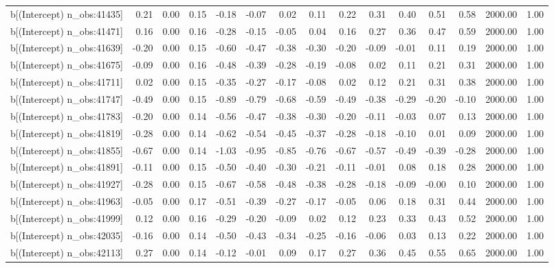 \begin{table}[ht]
\begin{tabular}{rrrrrrrrrrrrrrr}
  b[(Intercept) n\_obs:41435] & 0.21 & 0.00 & 0.15 & -0.18 & -0.07 & 0.02 & 0.11 & 0.22 & 0.31 & 0.40 & 0.51 & 0.58 & 2000.00 & 1.00 \\ 
  b[(Intercept) n\_obs:41471] & 0.16 & 0.00 & 0.16 & -0.28 & -0.15 & -0.05 & 0.04 & 0.16 & 0.27 & 0.36 & 0.47 & 0.59 & 2000.00 & 1.00 \\ 
  b[(Intercept) n\_obs:41639] & -0.20 & 0.00 & 0.15 & -0.60 & -0.47 & -0.38 & -0.30 & -0.20 & -0.09 & -0.01 & 0.11 & 0.19 & 2000.00 & 1.00 \\ 
  b[(Intercept) n\_obs:41675] & -0.09 & 0.00 & 0.16 & -0.48 & -0.39 & -0.28 & -0.19 & -0.08 & 0.02 & 0.11 & 0.21 & 0.31 & 2000.00 & 1.00 \\ 
  b[(Intercept) n\_obs:41711] & 0.02 & 0.00 & 0.15 & -0.35 & -0.27 & -0.17 & -0.08 & 0.02 & 0.12 & 0.21 & 0.31 & 0.38 & 2000.00 & 1.00 \\ 
  b[(Intercept) n\_obs:41747] & -0.49 & 0.00 & 0.15 & -0.89 & -0.79 & -0.68 & -0.59 & -0.49 & -0.38 & -0.29 & -0.20 & -0.10 & 2000.00 & 1.00 \\ 
  b[(Intercept) n\_obs:41783] & -0.20 & 0.00 & 0.14 & -0.56 & -0.47 & -0.38 & -0.30 & -0.20 & -0.11 & -0.03 & 0.07 & 0.13 & 2000.00 & 1.00 \\ 
  b[(Intercept) n\_obs:41819] & -0.28 & 0.00 & 0.14 & -0.62 & -0.54 & -0.45 & -0.37 & -0.28 & -0.18 & -0.10 & 0.01 & 0.09 & 2000.00 & 1.00 \\ 
  b[(Intercept) n\_obs:41855] & -0.67 & 0.00 & 0.14 & -1.03 & -0.95 & -0.85 & -0.76 & -0.67 & -0.57 & -0.49 & -0.39 & -0.28 & 2000.00 & 1.00 \\ 
  b[(Intercept) n\_obs:41891] & -0.11 & 0.00 & 0.15 & -0.50 & -0.40 & -0.30 & -0.21 & -0.11 & -0.01 & 0.08 & 0.18 & 0.28 & 2000.00 & 1.00 \\ 
  b[(Intercept) n\_obs:41927] & -0.28 & 0.00 & 0.15 & -0.67 & -0.58 & -0.48 & -0.38 & -0.28 & -0.18 & -0.09 & -0.00 & 0.10 & 2000.00 & 1.00 \\ 
  b[(Intercept) n\_obs:41963] & -0.05 & 0.00 & 0.17 & -0.51 & -0.39 & -0.27 & -0.17 & -0.05 & 0.06 & 0.18 & 0.31 & 0.44 & 2000.00 & 1.00 \\ 
  b[(Intercept) n\_obs:41999] & 0.12 & 0.00 & 0.16 & -0.29 & -0.20 & -0.09 & 0.02 & 0.12 & 0.23 & 0.33 & 0.43 & 0.52 & 2000.00 & 1.00 \\ 
  b[(Intercept) n\_obs:42035] & -0.16 & 0.00 & 0.14 & -0.50 & -0.43 & -0.34 & -0.25 & -0.16 & -0.06 & 0.03 & 0.13 & 0.22 & 2000.00 & 1.00 \\ 
  b[(Intercept) n\_obs:42113] & 0.27 & 0.00 & 0.14 & -0.12 & -0.01 & 0.09 & 0.17 & 0.27 & 0.36 & 0.45 & 0.55 & 0.65 & 2000.00 & 1.00 \\ 

\end{tabular}
\end{table}

